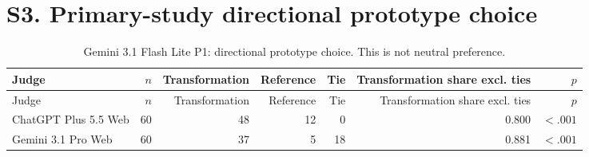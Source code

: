 \documentclass[10pt]{article}
\begin{document}
\section*{S3. Primary-study directional prototype choice}
\small
\begin{longtable}{lrrrrrr}
\caption{Gemini 3.1 Flash Lite P1: directional prototype choice. This is not neutral preference.}\label{tab:s3-pref31}\\
\toprule Judge & $n$ & Transformation & Reference & Tie & Transformation share excl. ties & $p$ \\ \midrule\endfirsthead
\toprule Judge & $n$ & Transformation & Reference & Tie & Transformation share excl. ties & $p$ \\ \midrule\endhead
\bottomrule\endfoot
ChatGPT Plus 5.5 Web & 60 & 48 & 12 & 0 & 0.800 & $<.001$ \\
Gemini 3.1 Pro Web & 60 & 37 & 5 & 18 & 0.881 & $<.001$ \\
\end{longtable}
\end{document}
